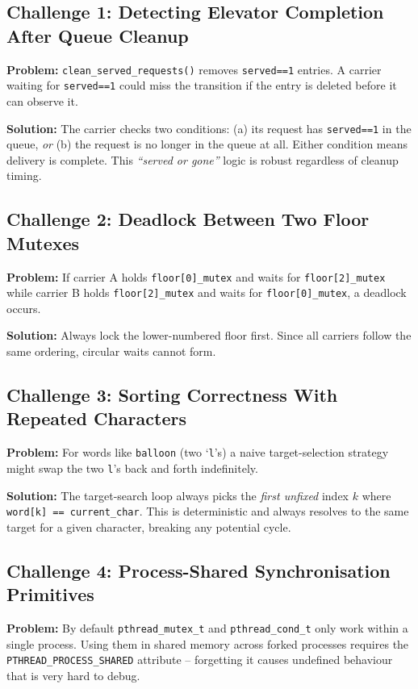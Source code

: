 \documentclass[12pt,a4paper]{article}
\newcommand{\code}[1]{\texttt{\small #1}}
\begin{document}
\subsection{Challenge 1: Detecting Elevator Completion After Queue Cleanup}

\textbf{Problem:} \code{clean\_served\_requests()} removes \code{served==1}
entries. A carrier waiting for \code{served==1} could miss the transition if the
entry is deleted before it can observe it.

\textbf{Solution:} The carrier checks two conditions: (a) its request has
\code{served==1} in the queue, \emph{or} (b) the request is no longer in the queue
at all. Either condition means delivery is complete. This \emph{``served or gone''}
logic is robust regardless of cleanup timing.

\subsection{Challenge 2: Deadlock Between Two Floor Mutexes}

\textbf{Problem:} If carrier A holds \code{floor[0]\_mutex} and waits for
\code{floor[2]\_mutex} while carrier B holds \code{floor[2]\_mutex} and waits for
\code{floor[0]\_mutex}, a deadlock occurs.

\textbf{Solution:} Always lock the lower-numbered floor first. Since all carriers
follow the same ordering, circular waits cannot form.

\subsection{Challenge 3: Sorting Correctness With Repeated Characters}

\textbf{Problem:} For words like \texttt{balloon} (two `\texttt{l}'s) a naive
target-selection strategy might swap the two \texttt{l}'s back and forth
indefinitely.

\textbf{Solution:} The target-search loop always picks the \emph{first unfixed}
index $k$ where \code{word[k] == current\_char}. This is deterministic and always
resolves to the same target for a given character, breaking any potential cycle.

\subsection{Challenge 4: Process-Shared Synchronisation Primitives}

\textbf{Problem:} By default \code{pthread\_mutex\_t} and \code{pthread\_cond\_t}
only work within a single process. Using them in shared memory across forked
processes requires the \code{PTHREAD\_PROCESS\_SHARED} attribute -- forgetting it
causes undefined behaviour that is very hard to debug.
\end{document}
